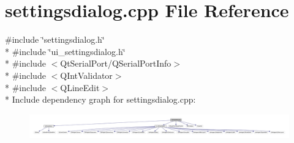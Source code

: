 \hypertarget{a00044}{\section{settingsdialog.\+cpp File Reference}
\label{a00044}
}
{\ttfamily \#include \char`\"{}settingsdialog.\+h\char`\"{}}\\*
{\ttfamily \#include \char`\"{}ui\+\_\+settingsdialog.\+h\char`\"{}}\\*
{\ttfamily \#include $<$Qt\+Serial\+Port/\+Q\+Serial\+Port\+Info$>$}\\*
{\ttfamily \#include $<$Q\+Int\+Validator$>$}\\*
{\ttfamily \#include $<$Q\+Line\+Edit$>$}\\*
Include dependency graph for settingsdialog.\+cpp\+:
\nopagebreak
\begin{figure}[H]
\begin{center}
\leavevmode
\includegraphics[width=350pt]{d8/d72/a00199}
\end{center}
\end{figure}

